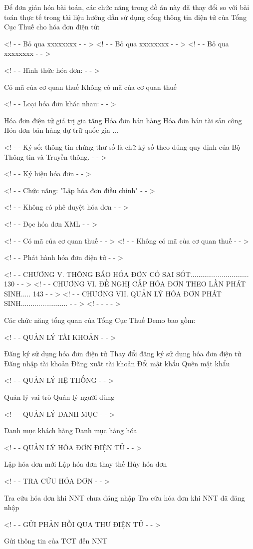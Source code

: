 Để đơn giản hóa bài toán, các chức năng trong đồ án này đã thay đổi so với bài toán thực tế trong tài liệu hướng dẫn sử dụng cổng thông tin điện tử của Tổng Cục Thuế cho hóa đơn điện tử:

<! - - Bỏ qua xxxxxxxx - - >
<! - - Bỏ qua xxxxxxxx - - >
<! - - Bỏ qua xxxxxxxx - - >

<! - - Hình thức hóa đơn: - - >

Có mã của cơ quan thuế
Không có mã của cơ quan thuế

<! - - Loại hóa đơn khác nhau: - - >

Hóa đơn điện tử giá trị gia tăng
Hóa đơn bán hàng
Hóa đơn bán tài sản công
Hóa đơn bán hàng dự trữ quốc gia
...

<! - - Ký số: thông tin chứng thư số là chữ ký số theo đúng quy định của Bộ Thông tin và Truyền thông. - - >

<! - - Ký hiệu hóa đơn - - >

<! - - Chức năng: "Lập hóa đơn điều chỉnh" - - >

<! - - Không có phê duyệt hóa đơn - - >

<! - - Đọc hóa đơn XML - - >

<! - - Có mã của cơ quan thuế - - >
<! - - Không có mã của cơ quan thuế - - >

<! - - Phát hành hóa đơn điện tử - - >

<! - - CHƯƠNG V. THÔNG BÁO HÓA ĐƠN CÓ SAI SÓT.............................. 130 - - >
<! - - CHƯƠNG VI. ĐỀ NGHỊ CẤP HÓA ĐƠN THEO LẦN PHÁT SINH..... 143 - - >
<! - - CHƯƠNG VII. QUẢN LÝ HÓA ĐƠN PHÁT SINH........................ - - >
<! - - - - >

Các chức năng tổng quan của Tổng Cục Thuế Demo bao gồm:

<! - - QUẢN LÝ TÀI KHOẢN - - >

Đăng ký sử dụng hóa đơn điện tử
Thay đổi đăng ký sử dụng hóa đơn điện tử
Đăng nhập tài khoản
Đăng xuất tài khoản
Đổi mật khẩu
Quên mật khẩu

<! - - QUẢN LÝ HỆ THỐNG - - >

Quản lý vai trò
Quản lý người dùng

<! - - QUẢN LÝ DANH MỤC - - >

Danh mục khách hàng
Danh mục hàng hóa

<! - - QUẢN LÝ HÓA ĐƠN ĐIỆN TỬ - - >

Lập hóa đơn mới
Lập hóa đơn thay thế
Hủy hóa đơn

<! - - TRA CỨU HÓA ĐƠN - - >

Tra cứu hóa đơn khi NNT chưa đăng nhập
Tra cứu hóa đơn khi NNT đã đăng nhập

<! - - GỬI PHẢN HỒI QUA THƯ ĐIỆN TỬ - - >

Gửi thông tin của TCT đến NNT